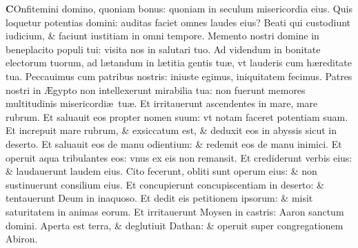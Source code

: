 \documentclass[a5paper,10pt]{book}
\def\ae{æ}
\def\AE{Æ}
\begin{document}
\begin{multicols*}{2}
\vspace{-.5em}
\lettrine[lines=2]{\bfseries \color{red} C}{}Onfitemini domino, quoniam bonus: quoniam in seculum misericordia eius.
\newline \color{red} Q\color{black}uis loquetur potentias domini: auditas faciet omnes laudes eius?
\newline \color{red} B\color{black}eati qui custodiunt iudicium, \& faciunt iustitiam in omni tempore.
\newline \color{red} M\color{black}emento nostri domine in beneplacito populi tui: visita nos in salutari tuo.
\newline \color{red} A\color{black}d videndum in bonitate electorum tuorum, ad l\ae tandum in l\ae titia gentis tu\ae , vt lauderis cum h\ae reditate tua.
\newline \color{red} P\color{black}eccauimus cum patribus nostris: iniuste egimus, iniquitatem fecimus.
\newline \color{red} P\color{black}atres nostri in \AE gypto non intellexerunt mirabilia tua: non fuerunt memores multitudinis misericordi\ae \ tu\ae .
\newline \color{red} E\color{black}t irritauerunt ascendentes in mare, mare rubrum.
\newline \color{red} E\color{black}t saluauit eos propter nomen suum: vt notam faceret potentiam suam.
\newline \color{red} E\color{black}t increpuit mare rubrum, \& exsiccatum est, \& deduxit eos in abyssis sicut in deserto.
\newline \color{red} E\color{black}t saluauit eos de manu odientium: \& redemit eos de manu inimici.
\newline \color{red} E\color{black}t operuit aqua tribulantes eos: vnus ex eis non remansit.
\newline \color{red} E\color{black}t crediderunt verbis eius: \& laudauerunt laudem eius.
\newline \color{red} C\color{black}ito fecerunt, obliti sunt operum eius: \& non sustinuerunt consilium eius.
\newline \color{red} E\color{black}t concupierunt concupiscentiam in deserto: \& tentauerunt Deum in inaquoso.
\newline \color{red} E\color{black}t dedit eis petitionem ipsorum: \& misit saturitatem in animas eorum.
\newline \color{red} E\color{black}t irritauerunt Moysen in castris: Aaron sanctum domini.
\newline \color{red} A\color{black}perta est terra, \& deglutiuit Dathan: \& operuit super congregationem Abiron.

\end{multicols*}
\end{document}
